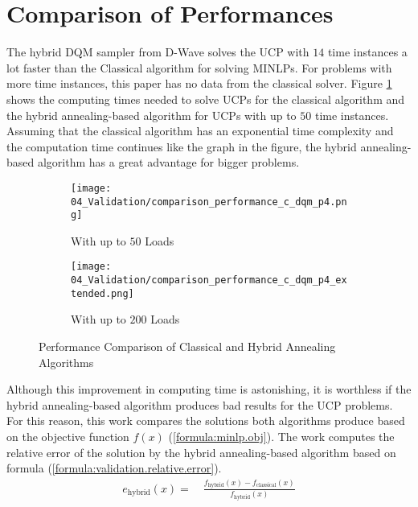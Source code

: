 \section{Comparison of Performances}
\label{evaluation:comparison}

The hybrid DQM sampler from D-Wave solves the UCP with $14$ time instances a lot faster than the Classical algorithm for solving MINLPs.
For problems with more time instances, this paper has no data from the classical solver.
Figure \ref{figure:evaluation.comparison.performance} shows the computing times needed to solve UCPs for the classical algorithm and the hybrid annealing-based algorithm for UCPs with up to $50$ time instances.
Assuming that the classical algorithm has an exponential time complexity and the computation time continues like the graph in the figure, the hybrid annealing-based algorithm has a great advantage for bigger problems.

\begin{figure}
  \begin{subfigure}[b]{0.5 \textwidth}
    \centering
    \texttt{[image: 04\_Validation/comparison\_performance\_c\_dqm\_p4.png]}
    \caption{With up to $50$ Loads}
    \label{figure:evaluation.comparison.performance}
  \end{subfigure}
  \begin{subfigure}[b]{0.5 \textwidth}
    \centering
    \texttt{[image: 04\_Validation/comparison\_performance\_c\_dqm\_p4\_extended.png]}
    \caption{With up to $200$ Loads}
    \label{figure:evaluation.comparison.performance.extended}
  \end{subfigure}
  \caption{Performance Comparison of Classical and Hybrid Annealing Algorithms}
\end{figure}

Although this improvement in computing time is astonishing, it is worthless if the hybrid annealing-based algorithm produces bad results for the UCP problems.
For this reason, this work compares the solutions both algorithms produce based on the objective function $f(x)$ (\ref{formula:minlp.obj}).
The work computes the relative error of the solution by the hybrid annealing-based algorithm based on formula (\ref{formula:validation.relative.error}).
\begin{align}
  \label{formula:validation.relative.error}
  e_{\text{hybrid}}(x) = \quad \frac{f_{\text{hybrid}}(x) - f_{\text{classical}}(x)}{f_{\text{hybrid}}(x)}
\end{align}

